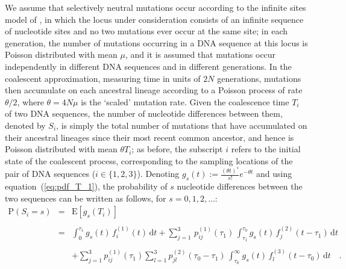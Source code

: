 \documentclass[11pt]{article}
\begin{document}
We assume that selectively neutral mutations occur according to the infinite sites model of \citet{Watterson1975}, in which 
the locus under consideration  
consists of an infinite sequence of nucleotide sites and no two mutations ever occur at the same site;
in each generation, the number of mutations occurring in a DNA sequence at this locus is Poisson distributed with mean $\mu$, and it is assumed that mutations occur independently in different DNA sequences and in different generations.
In the coalescent approximation, measuring time in units of $2N$ generations, mutations then accumulate on each ancestral lineage according to a Poisson process of rate $\theta/2$, where $\theta=4N\mu$ is the `scaled' mutation rate.
Given the coalescence time $T_{i}$ of two DNA sequences,
the number of nucleotide differences between them, denoted by $S_i$, is simply the total number of mutations that have accumulated on their ancestral lineages since their most recent common ancestor, and hence is Poisson distributed with mean $\theta T_{i}$;
as before, the subscript $i$ refers to the initial state of the coalescent process, corresponding to the sampling locations of the pair of DNA sequences ($i \in \{1,2,3\}$).
Denoting $g_{s}(t):=\frac{(\theta t)^{s}}{s!}e^{-\theta t}$ and using equation~(\ref{eq:pdf_T_1}), 
the probability of $s$ nucleotide differences between the two sequences can be written as follows, for $s=0,1,2,\ldots$:
\begin{equation*}
\begin{array}{lcl}
\mathrm{P}(S_{i}=s)&=&\mathrm{E}[g_{s}(T_{i})]\\
\\
&=&\displaystyle\int_{0}^{\tau_{1}} \! g_{s}(t) \, f^{(1)}_{i}(t)\, \mathrm{d}t + \displaystyle \sum_{j=1}^{3}\,p^{(1)}_{ij}(\tau_{1})\,\int_{\tau_{1}}^{\tau_{0}} \!g_{s}(t)\,f_{j}^{(2)}\left(t-\tau_{1}\right)\,\mathrm{d}t\\
\\
&&+  \displaystyle\sum_{j=1}^{3} p^{(1)}_{ij}(\tau_{1})\displaystyle\sum_{l=1}^{3}p^{(2)}_{jl}(\tau_{0}-\tau_{1})\,\int_{\tau_{0}}^{\infty} \!g_{s}(t)\,f^{(3)}_{l}(t-\tau_{0})\,  \mathrm{d}t 
\quad.
\end{array}
\end{equation*}
\end{document}
